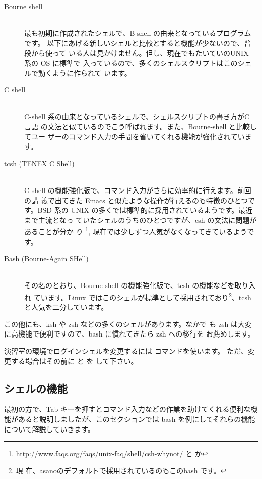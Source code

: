 \documentclass[platex]{jsarticle}
\begin{document}
 \begin{description}
 \item[Bourne shell] ~ \\
   最も初期に作成されたシェルで、B-shell の由来となっているプログラムです。
   以下にあげる新しいシェルと比較とすると機能が少ないので、普段から使って
   いる人は見かけません。但し、現在でもたいていのUNIX 系の OS に標準で
   入っているので、多くのシェルスクリプトはこのシェルで動くように作られて
   います。

 \item[C shell] ~ \\
   C-shell 系の由来となっているシェルで、シェルスクリプトの書き方がC 言語
   の文法と似ているのでこう呼ばれます。また、Bourne-shell と比較してユー
   ザーのコマンド入力の手間を省いてくれる機能が強化されています。

 \item[tcsh (TENEX C Shell)] ~ \\
   C shell の機能強化版で、コマンド入力がさらに効率的に行えます。前回の講
   義で出てきた Emacs と似たような操作が行えるのも特徴のひとつです。BSD
   系の UNIX の多くでは標準的に採用されているようです。最近まで主流となっ
   ていたシェルのうちのひとつですが、csh の文法に問題があることが分か
   り
   \footnote{ \url{http://www.faqs.org/faqs/unix-faq/shell/csh-whynot/} と
     か}, 現在では少しずつ人気がなくなってきているようです。

 \item[Bash (Bourne-Again SHell)] ~ \\
   その名のとおり、Bourne shell の機能強化版で、tcsh の機能などを取り入れ
   ています。Linux ではこのシェルが標準として採用されており\footnote{ 現
     在、asanoのデフォルトで採用されているのもこのbash です。}、tcsh
   と人気を二分しています。
 \end{description}

 この他にも、ksh や zsh などの多くのシェルがあります。なかで
 も zsh は大変に高機能で便利ですので、bash に慣れてきたら zsh への移行を
 お薦めします。

 演習室の環境でログインシェルを変更するには  コマンドを使います。
 ただ、変更する場合はその前に  と を  して下さい。


 \subsection{シェルの機能}
 最初の方で、Tab キーを押すとコマンド入力などの作業を助けてくれる便利な機
 能があると説明しましたが、このセクションでは bash を例にしてそれらの機能
 について解説していきます。
\end{document}
